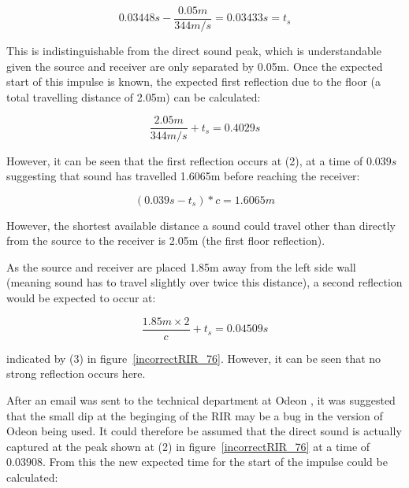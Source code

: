 \documentclass[../../main.tex]{subfiles}
\begin{document}
			\begin{equation}
			 0.03448s - \frac{0.05m}{344m/s} = 0.03433s = t_s
			\end{equation}

			This is indistinguishable from the direct sound peak, which is understandable given the source and receiver are only separated by 0.05m. Once the expected start of this impulse is known, the expected first reflection due to the floor (a total travelling distance of 2.05m) can be calculated:

			\begin{equation}
			\frac{2.05m}{344m/s} + t_s = 0.4029s
			\end{equation}

			However, it can be seen that the first reflection occurs at (2), at a time of $0.039s$ suggesting that sound has travelled 1.6065m before reaching the receiver:


			\begin{equation}
			(0.039s - t_s)*c = 1.6065m
			\end{equation}


			However, the shortest available distance a sound could travel other than directly from the source to the receiver is 2.05m (the first floor reflection).

			As the source and receiver are placed 1.85m away from the left side wall (meaning sound has to travel slightly over twice this distance), a second reflection would be expected to occur at:

			\begin{equation}
			\frac{1.85m\times{2}}{c} + t_s = 0.04509s
			\end{equation}

			indicated by (3) in figure~\ref{incorrectRIR_76}. However, it can be seen that no strong reflection occurs here.

			After an email was sent to the technical department at Odeon \cite{odeonEmail}, it was suggested that the small dip at the beginging of the \ac{RIR} may be a bug in the version of Odeon being used. It could therefore be assumed that the direct sound is actually captured at the peak shown at (2) in figure~\ref{incorrectRIR_76} at a time of $0.03908$. From this the new expected time for the start of the impulse could be calculated:
\end{document}
